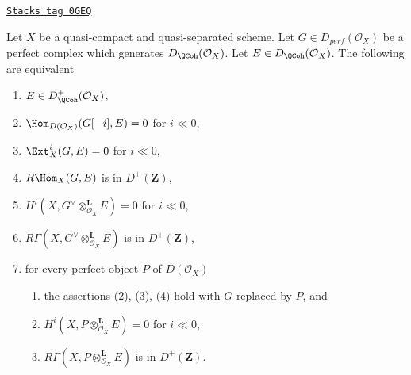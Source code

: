 \begin{proposition}
\label{perfect-proposition-detecting-bounded-below}
\href{https://stacks.math.columbia.edu/tag/0GEQ}{\texttt{Stacks tag 0GEQ}}

Let $X$ be a quasi-compact and quasi-separated scheme.
Let $G \in D_{perf}(\mathcal{O}_X)$
be a perfect complex which generates $D_\QCoh (\mathcal{O}_X)$. Let
$E \in D_\QCoh (\mathcal{O}_X)$. The following are equivalent
\begin{enumerate}
\item $E \in D^+_\QCoh (\mathcal{O}_X)$,
\item $\Hom_{D(\mathcal{O}_X)}(G[-i], E) = 0$ for $i \ll 0$,
\item $\Ext^i_X(G, E) = 0$ for $i \ll 0$,
\item $R\Hom_X(G, E)$ is in $D^+(\mathbf{Z})$,
\item $H^i(X, G^\vee \otimes_{\mathcal{O}_X}^\mathbf{L} E) = 0$
for $i \ll 0$,
\item $R\Gamma(X, G^\vee \otimes_{\mathcal{O}_X}^\mathbf{L} E)$
is in $D^+(\mathbf{Z})$,
\item for every perfect object $P$ of $D(\mathcal{O}_X)$
\begin{enumerate}
\item the assertions (2), (3), (4) hold with $G$ replaced by $P$, and
\item $H^i(X, P \otimes_{\mathcal{O}_X}^\mathbf{L} E) = 0$ for $i \ll 0$,
\item $R\Gamma(X, P \otimes_{\mathcal{O}_X}^\mathbf{L} E)$
is in $D^+(\mathbf{Z})$.
\end{enumerate}
\end{enumerate}
\end{proposition}


